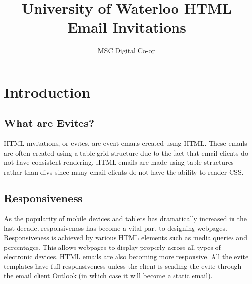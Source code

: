 \documentclass[a4paper,11pt]{article}
\author{MSC Digital Co-op}
\title{University of Waterloo HTML Email Invitations}
\begin{document}
	
	\maketitle %
	\tableofcontents
	\listoffigures
	\listoftables
	
	\newpage
	\section{Introduction}
	\subsection{What are Evites?}
	HTML invitations, or evites, are event emails created using HTML. These emails are often created using a table grid structure due to the fact that email clients do not have consistent rendering. HTML emails are made using table structures rather than divs since many email clients do not have the ability to render CSS.
	\subsection{Responsiveness}
	As the popularity of mobile devices and tablets has dramatically increased in the last decade, responsiveness has become a vital part to designing webpages. Responsiveness is achieved by various HTML elements such as media queries and percentages. This allows webpages to display properly across all types of electronic devices. HTML emails are also becoming more responsive. All the evite templates have full responsiveness unless the client is sending the evite through the email client Outlook (in which case it will become a static email).
	
	
\end{document}
